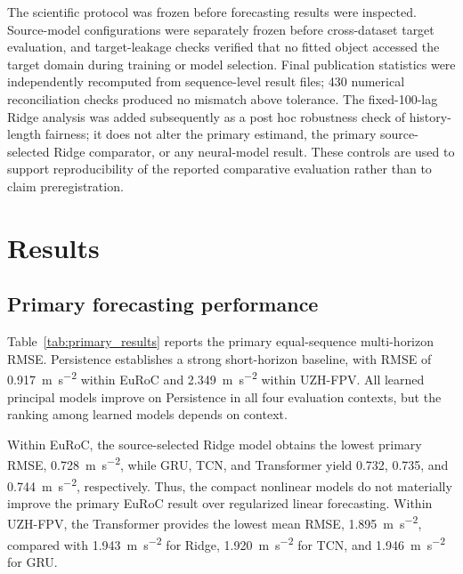 \documentclass[preprint,12pt]{elsarticle}
\begin{document}
The scientific protocol was frozen before forecasting results were inspected. Source-model configurations were separately frozen before cross-dataset target evaluation, and target-leakage checks verified that no fitted object accessed the target domain during training or model selection. Final publication statistics were independently recomputed from sequence-level result files; 430 numerical reconciliation checks produced no mismatch above tolerance. The fixed-100-lag Ridge analysis was added subsequently as a post hoc robustness check of history-length fairness; it does not alter the primary estimand, the primary source-selected Ridge comparator, or any neural-model result. These controls are used to support reproducibility of the reported comparative evaluation rather than to claim preregistration.

\section{Results}
\label{sec:results}

\subsection{Primary forecasting performance}

Table~\ref{tab:primary_results} reports the primary equal-sequence multi-horizon RMSE. Persistence establishes a strong short-horizon baseline, with RMSE of \SI{0.917}{\metre\per\second\squared} within EuRoC and \SI{2.349}{\metre\per\second\squared} within UZH-FPV. All learned principal models improve on Persistence in all four evaluation contexts, but the ranking among learned models depends on context.

Within EuRoC, the source-selected Ridge model obtains the lowest primary RMSE, \SI{0.728}{\metre\per\second\squared}, while GRU, TCN, and Transformer yield 0.732, 0.735, and \SI{0.744}{\metre\per\second\squared}, respectively. Thus, the compact nonlinear models do not materially improve the primary EuRoC result over regularized linear forecasting. Within UZH-FPV, the Transformer provides the lowest mean RMSE, \SI{1.895}{\metre\per\second\squared}, compared with \SI{1.943}{\metre\per\second\squared} for Ridge, \SI{1.920}{\metre\per\second\squared} for TCN, and \SI{1.946}{\metre\per\second\squared} for GRU.
\end{document}
